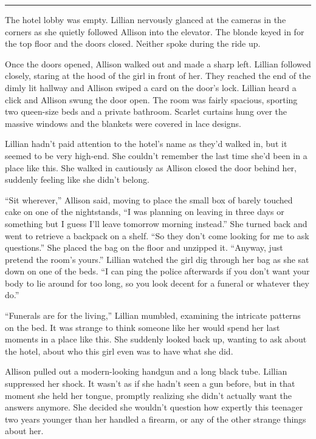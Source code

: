 \begin{Standard}
\fancybreak{* * *}

The hotel lobby was empty. Lillian nervously glanced at the cameras in the corners
as she quietly followed Allison into the elevator. The blonde keyed in for the top
floor and the doors closed. Neither spoke during the ride up.

Once the doors opened, Allison walked out and made a sharp left. Lillian followed
closely, staring at the hood of the girl in front of her. They reached the end of the dimly
lit hallway and Allison swiped a card on the door's lock. Lillian heard a click and
Allison swung the door open. The room was fairly spacious, sporting two queen-size beds
and a private bathroom. Scarlet curtains hung over the massive windows and the blankets
were covered in lace designs.

Lillian hadn't paid attention to the hotel's name as they'd walked in, but it seemed
to be very high-end. She couldn't remember the last time she'd been in a place like this.
She walked in cautiously as Allison closed the door behind her, suddenly feeling like
she didn't belong.

``Sit wherever,'' Allison said, moving to place the small box of barely touched cake
on one of the nightstands, ``I was planning on leaving in three days or something
but I guess I'll leave tomorrow morning instead.'' She turned back and went to retrieve
a backpack on a shelf. ``So they don't come looking for me to ask questions.''
She placed the bag on the floor and unzipped it. ``Anyway, just pretend the room's yours.''
Lillian watched the girl dig through her bag as she sat down on one of the beds.
``I can ping the police afterwards if you don't want your body to lie around for too long,
so you look decent for a funeral or whatever they do.''

``Funerals are for the living,'' Lillian mumbled, examining the intricate patterns on the bed.
It was strange to think someone like her would spend her last moments in a place like this.
She suddenly looked back up, wanting to ask about the hotel, about who this girl even was
to have what she did.

Allison pulled out a modern-looking handgun and a long black tube. Lillian suppressed
her shock. It wasn't as if she hadn't seen a gun before, but in that moment she held her tongue,
promptly realizing she didn't actually want the answers anymore. She decided she wouldn't
question how expertly this teenager two years younger than her handled a firearm,
or any of the other strange things about her.


\end{Standard}
